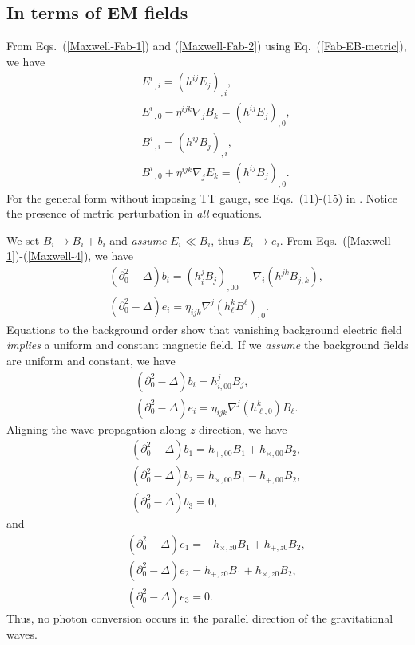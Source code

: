 \documentclass[twocolumn,amsmath,amssymb]{revtex4}
\newcommand{\bea}{\begin{eqnarray}}
\newcommand{\eea}{\end{eqnarray}}
\begin{document}
\subsection{In terms of EM fields}

From Eqs.\ (\ref{Maxwell-Fab-1}) and (\ref{Maxwell-Fab-2}) using Eq.\ (\ref{Fab-EB-metric}), we have
\bea
   & & E^i_{\;\;,i} = ( h^{ij} E_j )_{,i},
   \label{Maxwell-1} \\
   & & E^i_{\;\;,0} - \eta^{ijk} \nabla_j B_k
       = ( h^{ij} E_j )_{,0},
   \label{Maxwell-2} \\
   & & B^i_{\;\;,i} = ( h^{ij} B_j )_{,i},
   \label{Maxwell-3} \\
   & & B^i_{\;\;,0} + \eta^{ijk} \nabla_j E_k
       = ( h^{ij} B_j )_{,0}.
   \label{Maxwell-4}
\eea
For the general form without imposing TT gauge, see Eqs.\ (11)-(15) in \cite{EM-definition}. Notice the presence of metric perturbation in {\it all} equations.

We set $B_i \rightarrow B_i + b_i$ and {\it assume} $E_i \ll B_i$, thus $E_i \rightarrow e_i$. From Eqs.\ (\ref{Maxwell-1})-(\ref{Maxwell-4}), we have
\bea
   & & ( \partial_0^2 - \Delta ) b_i
       = ( h_i^j B_j )_{,00}
       - \nabla_i ( h^{jk} B_{j,k} ),
   \label{b-eq-TT} \\
   & & ( \partial_0^2 - \Delta ) e_i
       = \eta_{ijk} \nabla^j ( h^k_\ell B^\ell )_{,0}.
   \label{e-eq-TT}
\eea
Equations to the background order show that vanishing background electric field {\it implies} a uniform and constant magnetic field. If we {\it assume} the background fields are uniform and constant, we have
\bea
   & & ( \partial_0^2 - \Delta ) b_i
       = h_{i,00}^j B_j,
   \\
   & & ( \partial_0^2 - \Delta ) e_i
       = \eta_{ijk} \nabla^j ( h^k_{\ell,0} ) B_\ell.
\eea
Aligning the wave propagation along $z$-direction, we have
\bea
   & & ( \partial_0^2 - \Delta ) b_1
       = h_{+,00} B_1 + h_{\times,00} B_2,
   \label{EM-B-1} \\
   & & ( \partial_0^2 - \Delta ) b_2
       = h_{\times,00} B_1 - h_{+,00} B_2,
   \label{EM-B-2} \\
   & & ( \partial_0^2 - \Delta ) b_3
       = 0,
   \label{EM-B-3}
\eea
and
\bea
   & & ( \partial_0^2 - \Delta ) e_1
       = - h_{\times,z0} B_1 + h_{+,z0} B_2,
   \label{EM-e-1} \\
   & & ( \partial_0^2 - \Delta ) e_2
       = h_{+,z0} B_1 + h_{\times,z0} B_2,
   \label{EM-e-2} \\
   & & ( \partial_0^2 - \Delta ) e_3
       = 0.
   \label{EM-e-3}
\eea
Thus, no photon conversion occurs in the parallel direction of the gravitational waves.%
\end{document}
